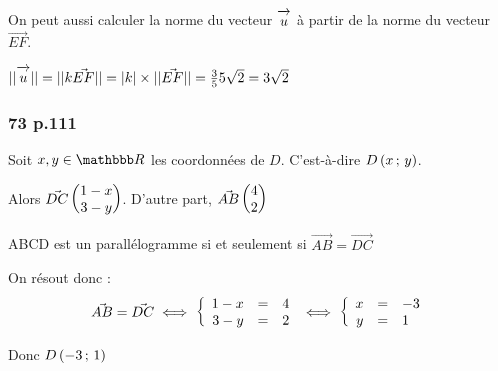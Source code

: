 \documentclass[10pt,a4paper,openany,twoside, prof]{book}
\begin{document}
\begin{rem}{}{}
    On peut aussi calculer la norme du vecteur $\overrightarrow{\,\mathstrut u\,}$ à partir de la norme du vecteur $\vec{EF}$.

    $||\overrightarrow{\,\mathstrut u\,}|| = ||k\vec{EF}|| = |k|\times||\vec{EF}|| = \frac{3}{5} 5\sqrt{2} = 3\sqrt{2}$


\end{rem}
\subsubsection*{73 p.111}
Soit $x,y \in\R$ les coordonnées de $D$. C'est-à-dire $D\left(x\,;\,y\right)$.

Alors $\vec{DC}\begin{pmatrix}1-x\\3-y\end{pmatrix}$. D'autre part, $\vec{AB}\begin{pmatrix}4\\2\end{pmatrix}$

ABCD est un parallélogramme si et seulement si $\vec{AB}=\vec{DC}$

On résout donc :
\begin{align*}
    \vec{AB}=\vec{DC} \iff \left\{\begin{array}{rcl} 1-x &=& 4 \\ 3-y &=& 2 \end{array}\right. \iff \left\{\begin{array}{rcl} x &=& -3 \\ y &=& 1 \end{array}\right.
\end{align*}

Donc $D\left(-3\,;\,1\right)$
\end{document}
